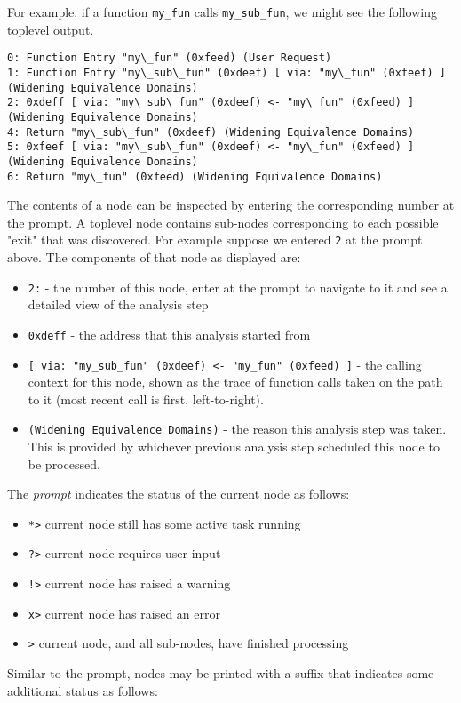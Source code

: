 For example, if a function \texttt{my\_fun} calls \texttt{my\_sub\_fun}, we might see the following toplevel output.
\begin{verbatim}
0: Function Entry "my\_fun" (0xfeed) (User Request)
1: Function Entry "my\_sub\_fun" (0xdeef) [ via: "my\_fun" (0xfeef) ]  (Widening Equivalence Domains)
2: 0xdeff [ via: "my\_sub\_fun" (0xdeef) <- "my\_fun" (0xfeed) ] (Widening Equivalence Domains)
4: Return "my\_sub\_fun" (0xdeef) (Widening Equivalence Domains)
5: 0xfeef [ via: "my\_sub\_fun" (0xdeef) <- "my\_fun" (0xfeed) ] (Widening Equivalence Domains)
6: Return "my\_fun" (0xfeed) (Widening Equivalence Domains)
\end{verbatim}
The contents of a node can be inspected by entering the corresponding number at the prompt.
A toplevel node contains sub-nodes corresponding to each possible "exit" that was discovered.
For example suppose we entered \texttt{2} at the prompt above.
The components of that node as displayed are:
\begin{itemize}
  \item\texttt{2:} - the number of this node, enter at the prompt to navigate to it and see a detailed view of the analysis step
\item\texttt{0xdeff} - the address that this analysis started from
\item \texttt{[ via: "my\_sub\_fun" (0xdeef) <- "my\_fun" (0xfeed) ]} -
    the calling context for this node, shown as the trace of function calls taken on the path to it (most recent call is first, left-to-right).
\item \texttt{(Widening Equivalence Domains)} - the reason this analysis step was taken. This is provided by whichever previous analysis step scheduled this node to be  processed.
\end{itemize}
The \emph{prompt} indicates the status of the current node as follows:
\begin{itemize}
\item \texttt{*>} current node still has some active task running
\item \texttt{?>} current node requires user input
\item \texttt{!>} current node has raised a warning
\item \texttt{x>} current node has raised an error
\item \texttt{>} current node, and all sub-nodes, have finished processing
\end{itemize}
Similar to the prompt, nodes may be printed with a suffix that indicates some additional status as follows:
